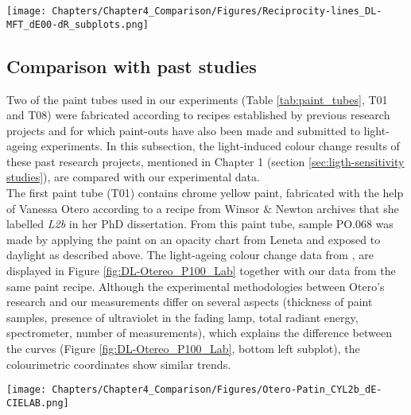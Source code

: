 \begin{figure*}
\centering
\texttt{[image: Chapters/Chapter4\_Comparison/Figures/Reciprocity-lines\_DL-MFT\_dE00-dR\_subplots.png]}
\caption[\hspace{0.3cm}Reciprocity lines with Daylight experiments data]{Reciprocity lines including the daylight experimental data and the microfading results: (a) \dEOO ; (b) \dRvis.}
\label{fig:reciprocity-lines_all_dE00}
\end{figure*}


\subsection{Comparison with past studies}

Two of the paint tubes used in our experiments (Table \ref{tab:paint_tubes}, T01 and T08) were fabricated according to recipes established by previous research projects and for which paint-outs have also been made and submitted to light-ageing experiments. In this subsection, the light-induced colour change results of these past research projects, mentioned in Chapter 1 (section \ref{sec:ligth-sensitivity studies}), are compared with our experimental data. \\

The first paint tube (T01) contains chrome yellow paint, fabricated with the help of Vanessa Otero according to a recipe from Winsor \& Newton archives that she labelled \textit{L2b} in her PhD dissertation. From this paint tube, sample PO.068 was made by applying the paint on an opacity chart from Leneta and exposed to daylight as described above. The light-ageing colour change data from \citet[351]{otero_historically_2018}, are displayed in Figure \ref{fig:DL-Otereo_P100_Lab} together with our data from the same paint recipe. Although the experimental methodologies between Otero’s research and our measurements differ on several aspects (\eg thickness of paint samples, presence of ultraviolet in the fading lamp, total radiant energy, spectrometer, number of measurements), which explains the difference between the \dEOO curves (Figure \ref{fig:DL-Otereo_P100_Lab}, bottom left subplot), the colourimetric coordinates show similar trends.

\begin{figure*}[!h]
\centering
\texttt{[image: Chapters/Chapter4\_Comparison/Figures/Otero-Patin\_CYL2b\_dE-CIELAB.png]}
\caption[\hspace{0.3cm}Comparison of light-ageing experiments on chrome yellow samples]{Comparison of light-ageing experiments on chrome yellow samples (results taken from Otero 2018 and the daylight experiments with PO.068).}
\label{fig:DL-Otereo_P100_Lab}
\end{figure*}


